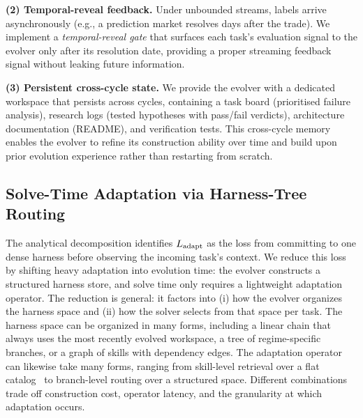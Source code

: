 \noindent\textbf{(2) Temporal-reveal feedback.}
Under unbounded streams, labels arrive asynchronously (e.g., a prediction market resolves days after the trade). We implement a \emph{temporal-reveal gate} that surfaces each task's evaluation signal to the evolver only after its resolution date, providing a proper streaming feedback signal without leaking future information.

\noindent\textbf{(3) Persistent cross-cycle state.}
We provide the evolver with a dedicated workspace that persists across cycles, containing a task board (prioritised failure analysis), research logs (tested hypotheses with pass/fail verdicts), architecture documentation (README), and verification tests. This cross-cycle memory enables the evolver to refine its construction ability over time and build upon prior evolution experience rather than restarting from scratch.




\subsection{Solve-Time Adaptation via Harness-Tree Routing}
\label{sec:method-nav}

The analytical decomposition identifies $L_{\text{adapt}}$ as the loss from committing to one dense harness before observing the incoming task's context. We reduce this loss by shifting heavy adaptation into evolution time: the evolver constructs a structured harness store, and solve time only requires a lightweight adaptation operator. The reduction is general: it factors into (i) how the evolver organizes the harness space and (ii) how the solver selects from that space per task. The harness space can be organized in many forms, including a linear chain that always uses the most recently evolved workspace, a tree of regime-specific branches, or a graph of skills with dependency edges. The adaptation operator can likewise take many forms, ranging from skill-level retrieval over a flat catalog~\cite{deerflow2025} to branch-level routing over a structured space. Different combinations trade off construction cost, operator latency, and the granularity at which adaptation occurs.

